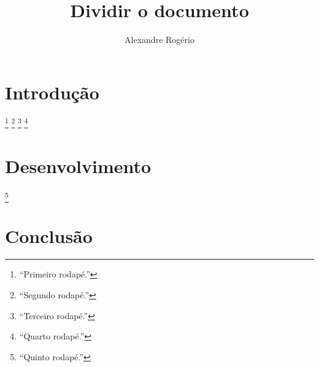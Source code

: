 \documentclass{article}
\begin{document}
	\title{\textbf{{\Huge Dividir o documento}}}
	\author{Alexandre Rogério}
	\maketitle
	\thispagestyle{empty}
	\newpage
	
	\setcounter{page}{1}
	\tableofcontents
	\newpage
	
	\listoffigures
	\newpage
	
	\listoftables
	\newpage
	
	\setcounter{page}{1}
	
	\section{Introdução}
		
		\footnote{\enquote{Primeiro rodapé.}}
		\footnote{\enquote{Segundo rodapé.}}
		\footnote{\enquote{Terceiro rodapé.}}
		\footnote{\enquote{Quarto rodapé.}}
	\section{Desenvolvimento}
		
		\footnote{\enquote{Quinto rodapé.}}
	\section{Conclusão}
		
\end{document}
